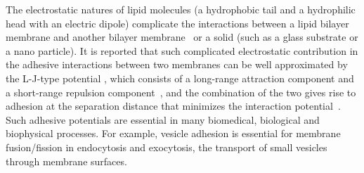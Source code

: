 \documentclass[prf,superscriptaddress,showpacs]{revtex4-1}
\begin{document}
%
The electrostatic
natures of lipid molecules (a hydrophobic tail and a hydrophilic head
with an electric dipole) complicate the interactions between a lipid
bilayer membrane and another bilayer
membrane~\cite{EvansMetcalfe1984_BJ, Book_PhysicalBasisCellAdhesion,Book_IntermolecularSurfaceForces,PerutkovaFrank-Bertoncelij2013_CSB} 
or a solid (such as a glass substrate
or a nano particle).  It is reported that such complicated electrostatic contribution in the adhesive interactions between two membranes can be well approximated by the 
L-J-type potential \cite{FlormannAouane2017_SciReports}, which consists of a long-range attraction component and a
short-range repulsion component~\cite{Book_IntermolecularSurfaceForces},
and the combination of the two gives rise to adhesion at the separation
distance that minimizes the interaction
potential~\cite{Book_IntermolecularSurfaceForces}. Such adhesive
potentials are essential in many biomedical, biological and biophysical
processes.  For example, vesicle adhesion is essential for membrane
fusion/fission in endocytosis and exocytosis, the transport of small
vesicles through membrane surfaces.
\end{document}
